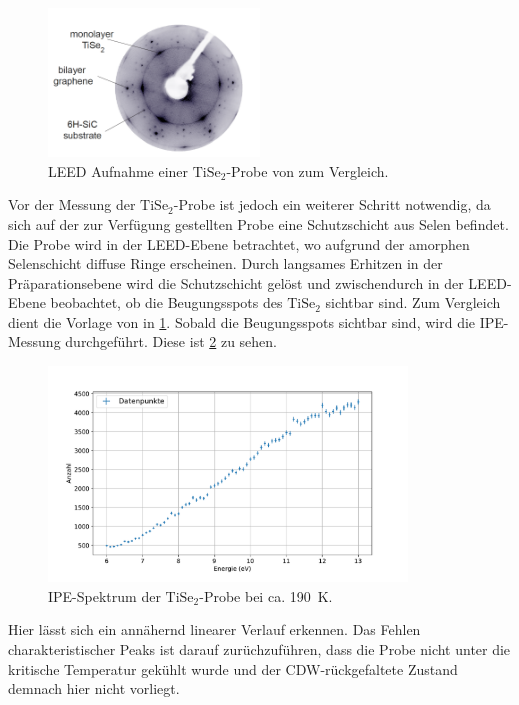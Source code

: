 \

\begin{figure}[!ht]
    \centering
    \includegraphics[width=0.5\textwidth]{img/TiSe2LEED}
    \caption{LEED Aufnahme einer $\text{TiSe}_2$-Probe von \cite{leed_sample} zum Vergleich.}
    \label{fig_leed_sample}
\end{figure}
Vor der Messung der $\text{TiSe}_2$-Probe ist jedoch ein weiterer Schritt notwendig, da sich auf der zur Verfügung gestellten Probe eine Schutzschicht aus Selen befindet.
Die Probe wird in der LEED-Ebene betrachtet, wo aufgrund der amorphen Selenschicht diffuse Ringe erscheinen.
Durch langsames Erhitzen in der Präparationsebene wird die Schutzschicht gelöst und zwischendurch in der LEED-Ebene beobachtet, ob die Beugungsspots des $\text{TiSe}_2$ sichtbar sind.
Zum Vergleich dient die Vorlage von \cite{leed_sample} in \cref{fig_leed_sample}.
Sobald die Beugungsspots sichtbar sind, wird die IPE-Messung durchgeführt. %
Diese ist \cref{fig_ipe_thighs2} zu sehen.
\begin{figure}[!ht]
    \centering
    \includegraphics[width=0.85\textwidth]{plots/TiSe2.pdf}
    \caption{IPE-Spektrum der $\text{TiSe}_2$-Probe bei ca. \SI{190}{\kelvin}.}
    \label{fig_ipe_thighs2}
\end{figure}
Hier lässt sich ein annähernd linearer Verlauf erkennen.
Das Fehlen charakteristischer Peaks ist darauf zurüchzuführen, dass die Probe nicht unter die kritische Temperatur gekühlt wurde und der CDW-rückgefaltete Zustand demnach hier nicht vorliegt.


